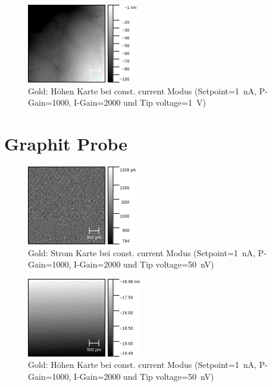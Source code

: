 \documentclass[sn-mathphys-num,iicol]{sn-jnl}
\theoremstyle{thmstyleone}
\theoremstyle{thmstyletwo}
\theoremstyle{thmstylethree}
\begin{document}
\begin{figure}[t]
        \centering
        \includegraphics[width=.5\textwidth]{../data/Gold_400nm_z.png}
        \caption{Gold: Höhen Karte bei const. current Modus (Setpoint=\SI{1}{\nano A}, P-Gain=\SI{1000}{}, I-Gain=\SI{2000}{} und Tip voltage=\SI{1}{V})} \label{fig:g400nmz}
\end{figure}
\section{Graphit Probe}
\begin{figure}[t]
        \centering
        \includegraphics[width=.5\textwidth]{../data/Graphit_4nm_1V_current.png}
        \caption{Gold: Strom Karte bei const. current Modus (Setpoint=\SI{1}{\nano A}, P-Gain=\SI{1000}{}, I-Gain=\SI{2000}{} und Tip voltage=\SI{50}{\nano V})} \label{fig:gr4nm50mVc}
\end{figure}
\begin{figure}[t]
        \centering
        \includegraphics[width=.5\textwidth]{../data/Graphit_4nm_1V_z.png}
        \caption{Gold: Höhen Karte bei const. current Modus (Setpoint=\SI{1}{\nano A}, P-Gain=\SI{1000}{}, I-Gain=\SI{2000}{} und Tip voltage=\SI{50}{\nano V})} \label{fig:gr4nm50mVz}
\end{figure}



\end{document}
